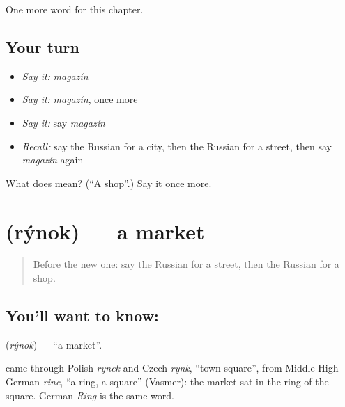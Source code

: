 \begin{grammarlens}[title={What you've built}]
One more word for this chapter.
\end{grammarlens}

\subsection*{Your turn}
\begin{itemize}
\raggedright
  \item \emph{Say it:} \emph{magazín}
  \item \emph{Say it:} \emph{magazín}, once more
  \item \emph{Say it:} say \emph{magazín}
  \item \emph{Recall:} say the Russian for a city, then the Russian for a street, then say \emph{magazín} again
\end{itemize}

\begin{tcolorbox}[breakable,colback=teal!4,colframe=teal!35!black,title={Before you move on}]
What does  mean? (\textquotedblleft{}A shop\textquotedblright{}.) Say it once more.
\end{tcolorbox}
\section[\texorpdfstring{\ru{рынок} (rýnok)}{рынок (rýnok)}]{ (rýnok) — a market}

\label{lesson:RU-C77-market}



\begin{quote}
Before the new one: say the Russian for a street, then the Russian for a shop.
\end{quote}

\subsection*{You'll want to know: }
\textbf{} (\emph{rýnok}) — \textquotedblleft{}a market\textquotedblright{}.

\begin{cousinweb}
\textbf{} came through Polish \emph{rynek} and Czech \emph{rynk}, \textquotedblleft{}town square\textquotedblright{}, from Middle High German \emph{rinc}, \textquotedblleft{}a ring, a square\textquotedblright{} (Vasmer): the market sat in the ring of the square. German \emph{Ring} is the same word.
\end{cousinweb}


